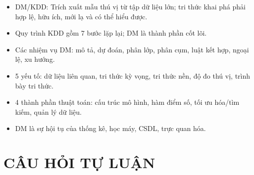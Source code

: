 \documentclass[10pt]{article}
\begin{document}
\begin{itemize}
    \item DM/KDD: Trích xuất mẫu thú vị từ tập dữ liệu lớn; tri thức khai phá phải hợp lệ, hữu ích, mới lạ và có thể hiểu được.
    \item Quy trình KDD gồm 7 bước lặp lại; DM là thành phần cốt lõi.
    \item Các nhiệm vụ DM: mô tả, dự đoán, phân lớp, phân cụm, luật kết hợp, ngoại lệ, xu hướng.
    \item 5 yếu tố: dữ liệu liên quan, tri thức kỳ vọng, tri thức nền, độ đo thú vị, trình bày tri thức.
    \item 4 thành phần thuật toán: cấu trúc mô hình, hàm điểm số, tối ưu hóa/tìm kiếm, quản lý dữ liệu.
    \item DM là sự hội tụ của thống kê, học máy, CSDL, trực quan hóa.
\end{itemize}

\newpage
\section{CÂU HỎI TỰ LUẬN}
\end{document}
